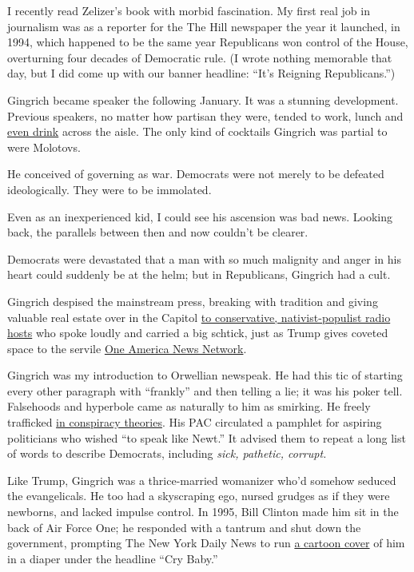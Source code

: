 I recently read Zelizer's book with morbid fascination. My first real
job in journalism was as a reporter for the The Hill newspaper the year
it launched, in 1994, which happened to be the same year Republicans won
control of the House, overturning four decades of Democratic rule. (I
wrote nothing memorable that day, but I did come up with our banner
headline: ``It's Reigning Republicans.'')

Gingrich became speaker the following January. It was a stunning
development. Previous speakers, no matter how partisan they were, tended
to work, lunch and
\href{https://campaignstops.blogs.nytimes3xbfgragh.onion/2012/10/05/frenemies-a-love-story/}{even
drink} across the aisle. The only kind of cocktails Gingrich was partial
to were Molotovs.

He conceived of governing as war. Democrats were not merely to be
defeated ideologically. They were to be immolated.

Even as an inexperienced kid, I could see his ascension was bad news.
Looking back, the parallels between then and now couldn't be clearer.

Democrats were devastated that a man with so much malignity and anger in
his heart could suddenly be at the helm; but in Republicans, Gingrich
had a cult.

Gingrich despised the mainstream press, breaking with tradition and
giving valuable real estate over in the Capitol
\href{https://www.washingtonpost.com/archive/lifestyle/1995/01/05/the-talkmeisters/528fe9d1-e4e7-4c51-a0a1-d5f6e2fee610/}{to
conservative, nativist-populist radio hosts} who spoke loudly and
carried a big schtick, just as Trump gives coveted space to the servile
\href{https://www.nytimes3xbfgragh.onion/article/oann-trump.html}{One
America News Network}.

Gingrich was my introduction to Orwellian newspeak. He had this tic of
starting every other paragraph with ``frankly'' and then telling a lie;
it was his poker tell. Falsehoods and hyperbole came as naturally to him
as smirking. He freely trafficked
\href{https://www.washingtonpost.com/archive/politics/1995/07/26/gingrich-not-convinced-foster-death-was-suicide/4003f01f-83ad-4b41-9b9c-e209344a716c/}{in
conspiracy theories}. His PAC circulated a pamphlet for aspiring
politicians who wished ``to speak like Newt.'' It advised them to repeat
a long list of words to describe Democrats, including \emph{sick,
pathetic, corrupt.}

Like Trump, Gingrich was a thrice-married womanizer who'd somehow
seduced the evangelicals. He too had a skyscraping ego, nursed grudges
as if they were newborns, and lacked impulse control. In 1995, Bill
Clinton made him sit in the back of Air Force One; he responded with a
tantrum and shut down the government, prompting The New York Daily News
to run
\href{https://www.nydailynews.com/blogs/pageviews/newt-gingrich-crybaby-famous-daily-news-cover-explained-blog-entry-1.1637386}{a
cartoon cover} of him in a diaper under the headline ``Cry Baby.''


